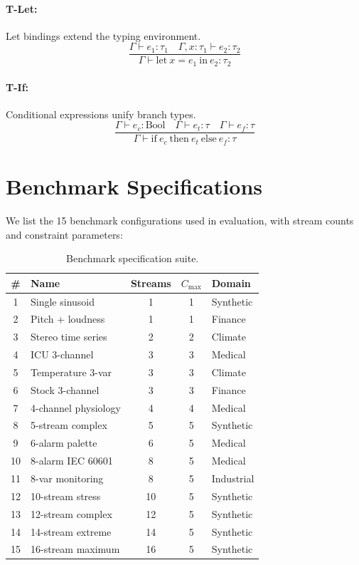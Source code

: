 \documentclass[sigchi, nonacm]{acmart}
\begin{document}
\paragraph{T-Let:} Let bindings extend the typing environment.
\begin{equation}
\frac{\Gamma \vdash e_1 : \tau_1 \quad \Gamma, x : \tau_1 \vdash e_2 : \tau_2}{\Gamma \vdash \mathrm{let}\ x = e_1\ \mathrm{in}\ e_2 : \tau_2}
\end{equation}

\paragraph{T-If:} Conditional expressions unify branch types.
\begin{equation}
\frac{\Gamma \vdash e_c : \mathrm{Bool} \quad \Gamma \vdash e_t : \tau \quad \Gamma \vdash e_f : \tau}{\Gamma \vdash \mathrm{if}\ e_c\ \mathrm{then}\ e_t\ \mathrm{else}\ e_f : \tau}
\end{equation}

\section{Benchmark Specifications}
\label{sec:appendix_benchmarks}

We list the 15 benchmark configurations used in evaluation, with stream counts and constraint parameters:

\begin{table}[h]
\centering
\caption{Benchmark specification suite.}
\label{tab:benchmarks_appendix}
\small
\begin{tabular}{clccl}
\toprule
\textbf{\#} & \textbf{Name} & \textbf{Streams} & \textbf{$C_\mathrm{max}$} & \textbf{Domain} \\
\midrule
1 & Single sinusoid & 1 & 1 & Synthetic \\
2 & Pitch + loudness & 1 & 1 & Finance \\
3 & Stereo time series & 2 & 2 & Climate \\
4 & ICU 3-channel & 3 & 3 & Medical \\
5 & Temperature 3-var & 3 & 3 & Climate \\
6 & Stock 3-channel & 3 & 3 & Finance \\
7 & 4-channel physiology & 4 & 4 & Medical \\
8 & 5-stream complex & 5 & 5 & Synthetic \\
9 & 6-alarm palette & 6 & 5 & Medical \\
10 & 8-alarm IEC 60601 & 8 & 5 & Medical \\
11 & 8-var monitoring & 8 & 5 & Industrial \\
12 & 10-stream stress & 10 & 5 & Synthetic \\
13 & 12-stream complex & 12 & 5 & Synthetic \\
14 & 14-stream extreme & 14 & 5 & Synthetic \\
15 & 16-stream maximum & 16 & 5 & Synthetic \\
\bottomrule
\end{tabular}
\end{table}
\end{document}
